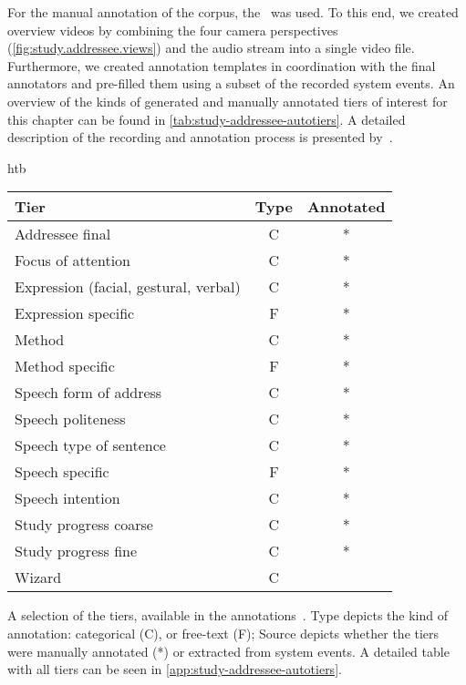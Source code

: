 For the manual annotation of the corpus, the~ was used.
To this end, we created overview videos by combining the four camera perspectives (\cref{fig:study.addressee.views}) and the audio stream into a single video file. 
Furthermore, we created annotation templates in coordination with the final annotators and pre-filled them using a subset of the recorded system events.
An overview of the kinds of generated and manually annotated tiers of interest for this chapter can be found in \cref{tab:study-addressee-autotiers}.
A detailed description of the recording and annotation process is presented by~.
\begin{colored_table}{htb}
    \centering
    \begin{tabulary}{\textwidth}{ l C C }
        \toprule
        Tier                                  & Type & Annotated   \\ \midrule
        Addressee final                       &  C   & *        \\
        Focus of attention                    &  C   & *        \\
        Expression (facial, gestural, verbal) &  C   & *        \\
        Expression specific                   &  F   & *        \\
        Method                                &  C   & *        \\
        Method specific                       &  F   & *        \\
        Speech form of address                &  C   & *        \\
        Speech politeness                     &  C   & *        \\
        Speech type of sentence               &  C   & *        \\
        Speech specific                       &  F   & *        \\
        Speech intention                      &  C   & *        \\
        Study progress coarse                 &  C   & *        \\
        Study progress fine                   &  C   & *        \\
        Wizard                                &  C   &          \\
        \bottomrule
    \end{tabulary}
    \caption[Annotated tiers and their properties.]{\label{tab:study-addressee-autotiers}A selection of the tiers, available in the annotations~\cite{elansrc}.
    Type depicts the kind of annotation: categorical (C), or free-text (F);
    Source depicts whether the tiers were manually annotated (*) or extracted from system events.
    A detailed table with all tiers can be seen in \vref{app:study-addressee-autotiers}.
    } 
\end{colored_table}


